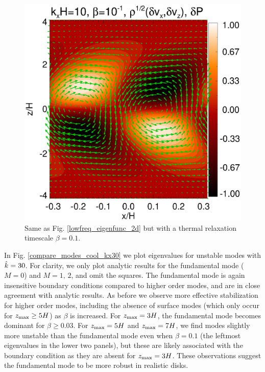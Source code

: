 \begin{figure}
  \includegraphics[width=\linewidth]{figures/result2d_cool}
  \caption{Same as  Fig. \ref{lowfreq_eigenfunc_2d} but with a thermal
    relaxation timescale $\beta=0.1$. 
    \label{lowfreq_eigenfunc_2d_cool}
  }
\end{figure}

In Fig. \ref{compare_modes_cool_kx30} we plot eigenvalues for unstable
modes with $\hat{k}=30$. For clarity, we only plot analytic results 
for the fundamental mode ($M=0$) and $M=1,\,2$, and omit the
squares. The fundamental mode is again insensitive boundary
conditions compared to higher order modes, and are in close agreement
with analytic results. As before we observe more effective
stabilization for higher order modes, including the absence of surface
modes (which only occur for $z_\mathrm{max}\geq 5H$) as $\beta$ is increased.  
For $z_\mathrm{max}=3H$, the fundamental mode becomes dominant for $\beta\geq
0.03$. For $z_\mathrm{max}=5H$ and $z_\mathrm{max}=7H$, we
find modes slightly more unstable than the fundamental
mode even when $\beta=0.1$ (the leftmost eigenvalues in the lower two
panels), but these are likely associated  with the boundary
condition as they are absent for $z_\mathrm{max}=3H$. These observations
suggest the fundamental mode to be more robust in realistic disks.    

